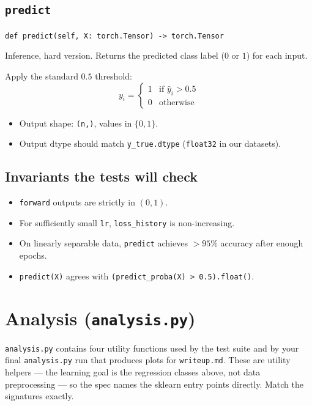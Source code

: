 \documentclass[11pt]{article}
\newcommand{\code}[1]{\texttt{\small #1}}
\begin{document}
\subsection{\texttt{predict}}

\noindent
\code{def predict(self, X: torch.Tensor) -> torch.Tensor}

\medskip\noindent
Inference, hard version. Returns the predicted class label
($0$ or $1$) for each input.

\medskip\noindent
Apply the standard $0.5$ threshold:
\[
    y_i =
    \begin{cases}
        1 & \text{if } \hat{y}_i > 0.5 \\
        0 & \text{otherwise}
    \end{cases}
\]

\begin{itemize}
    \item Output shape: \code{(n,)}, values in $\{0, 1\}$.
    \item Output dtype should match \code{y\_true.dtype} (\code{float32} in our
          datasets).
\end{itemize}

\subsection*{Invariants the tests will check}

\begin{itemize}
    \item \code{forward} outputs are strictly in $(0, 1)$.
    \item For sufficiently small \code{lr}, \code{loss\_history} is non-increasing.
    \item On linearly separable data, \code{predict} achieves $>95\%$ accuracy
          after enough epochs.
    \item \code{predict(X)} agrees with \code{(predict\_proba(X) > 0.5).float()}.
\end{itemize}

\section{Analysis (\texttt{analysis.py})}

\code{analysis.py} contains four utility functions used by the test suite and
by your final \code{analysis.py} run that produces plots for \code{writeup.md}.
These are utility helpers --- the learning goal is the regression classes
above, not data preprocessing --- so the spec names the sklearn entry points
directly. Match the signatures exactly.
\end{document}
